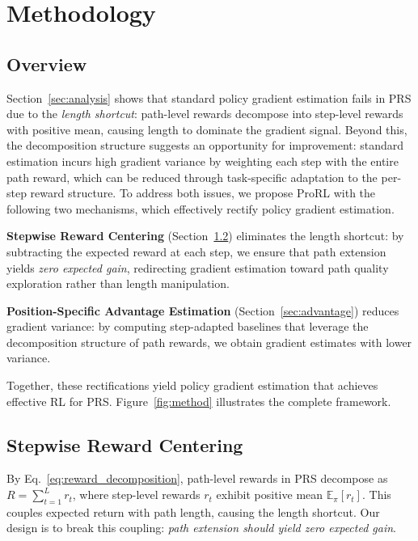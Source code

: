 \documentclass{llmxive}
\begin{document}
\section{Methodology}
\label{sec:method}
\subsection{Overview}
Section~\ref{sec:analysis} shows that standard policy gradient estimation fails in PRS due to the \emph{length shortcut}: path-level rewards decompose into step-level rewards with positive mean, causing length to dominate the gradient signal. Beyond this, the decomposition structure suggests an opportunity for improvement: standard estimation incurs high gradient variance by weighting each step with the entire path reward, which can be reduced through task-specific adaptation to the per-step reward structure. To address both issues, we propose ProRL with the following two mechanisms, which effectively rectify policy gradient estimation.

\textbf{Stepwise Reward Centering} (Section~\ref{sec:centering}) eliminates the length shortcut: by subtracting the expected reward at each step, we ensure that path extension yields \emph{zero expected gain}, redirecting gradient estimation toward path quality exploration rather than length manipulation.

\textbf{Position-Specific Advantage Estimation} (Section~\ref{sec:advantage}) reduces gradient variance: by computing step-adapted baselines that leverage the decomposition structure of path rewards, we obtain gradient estimates with lower variance. 

Together, these rectifications yield policy gradient estimation that achieves effective RL for PRS. Figure~\ref{fig:method} illustrates the complete framework.

\subsection{Stepwise Reward Centering}
\label{sec:centering}

By Eq.~\eqref{eq:reward_decomposition}, path-level rewards in PRS decompose as $R = \sum_{t=1}^{L} r_t$, where step-level rewards $r_t$ exhibit positive mean $\mathbb{E}_\pi[r_t]$. This couples expected return with path length, causing the length shortcut. Our design is to break this coupling: \emph{path extension should yield zero expected gain}.
\end{document}
